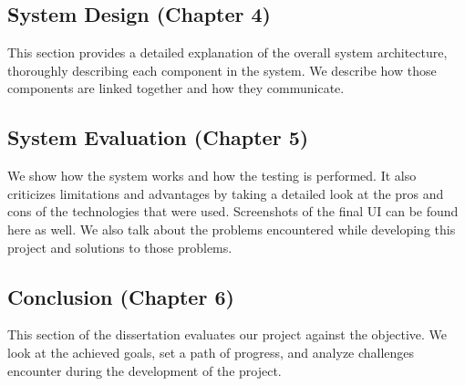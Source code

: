 \subsection{System Design (Chapter 4)}
This section provides a detailed explanation of the overall system architecture, thoroughly describing each component in the system. We describe how those components are linked together and how they communicate.

\subsection{System Evaluation (Chapter 5)}
We show how the system works and how the testing is performed.
It also criticizes limitations and advantages by taking a detailed look at the pros and cons of the technologies that were used.
Screenshots of the final UI can be found here as well.
We also talk about the problems encountered while developing this project and solutions to those problems. 
\subsection{Conclusion (Chapter 6)}
This section of the dissertation evaluates our project against the objective. We look at the achieved goals, set a path of progress, and analyze challenges encounter during the development of the project.



